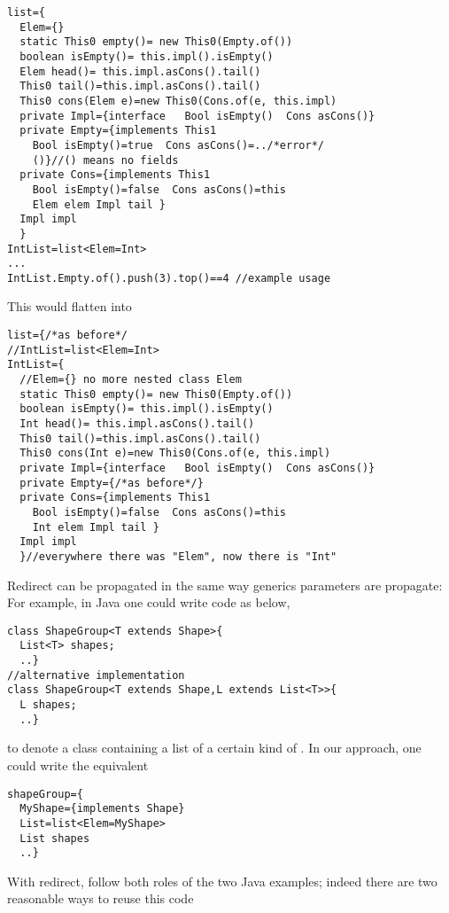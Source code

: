 \begin{lstlisting}
list={
  Elem={}
  static This0 empty()= new This0(Empty.of())
  boolean isEmpty()= this.impl().isEmpty()
  Elem head()= this.impl.asCons().tail()
  This0 tail()=this.impl.asCons().tail()
  This0 cons(Elem e)=new This0(Cons.of(e, this.impl)
  private Impl={interface   Bool isEmpty()  Cons asCons()}
  private Empty={implements This1
    Bool isEmpty()=true  Cons asCons()=../*error*/
    ()}//() means no fields
  private Cons={implements This1
    Bool isEmpty()=false  Cons asCons()=this
    Elem elem Impl tail }
  Impl impl
  }
IntList=list<Elem=Int>
...
IntList.Empty.of().push(3).top()==4 //example usage
\end{lstlisting}
This would flatten into
\begin{lstlisting}
list={/*as before*/
//IntList=list<Elem=Int>
IntList={
  //Elem={} no more nested class Elem
  static This0 empty()= new This0(Empty.of())
  boolean isEmpty()= this.impl().isEmpty()
  Int head()= this.impl.asCons().tail()
  This0 tail()=this.impl.asCons().tail()
  This0 cons(Int e)=new This0(Cons.of(e, this.impl)
  private Impl={interface   Bool isEmpty()  Cons asCons()}
  private Empty={/*as before*/}
  private Cons={implements This1
    Bool isEmpty()=false  Cons asCons()=this
    Int elem Impl tail }
  Impl impl
  }//everywhere there was "Elem", now there is "Int"
\end{lstlisting}

Redirect can be propagated in the same way generics parameters are propagate:
For example, in Java one could write code as below,
\begin{lstlisting}
class ShapeGroup<T extends Shape>{
  List<T> shapes;
  ..}
//alternative implementation
class ShapeGroup<T extends Shape,L extends List<T>>{
  L shapes;
  ..}
\end{lstlisting}
to denote a class containing a list of a certain kind of \Q@Shape@s.
In our approach, one could write the equivalent
\begin{lstlisting}
shapeGroup={
  MyShape={implements Shape}
  List=list<Elem=MyShape>
  List shapes
  ..}
\end{lstlisting}
With redirect, \Q@shapeGroup@ follow both roles of the two Java examples;
indeed there are two reasonable ways to reuse this code


